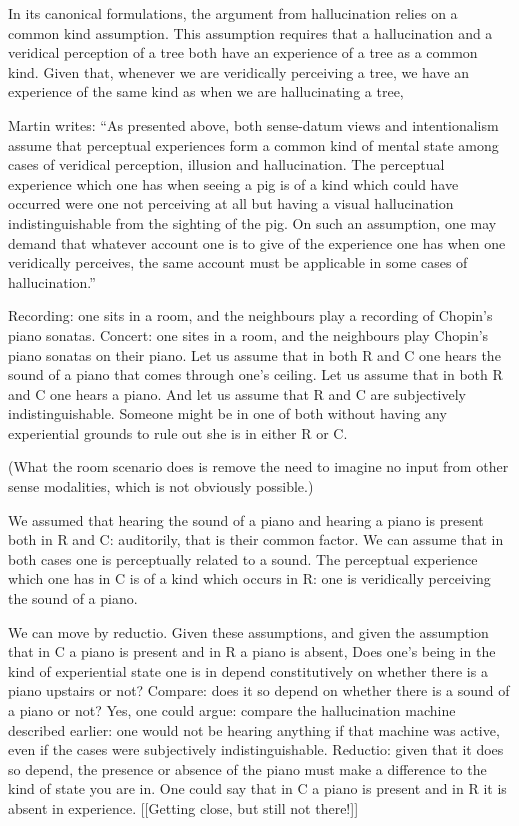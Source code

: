 \documentclass[sloppy, journal, git, bytitle, dodraft]{humapap}
\begin{document}
In its canonical formulations, the argument from hallucination relies on a common kind assumption. This assumption requires that a hallucination and a veridical perception of a tree both have an experience of a tree as a common kind. Given that, whenever we are veridically perceiving a tree, we have an experience of the same kind as when we are hallucinating a tree,

Martin writes: ``As presented above, both sense-datum views and intentionalism assume that perceptual experiences form a common kind of mental state among cases of veridical perception, illusion and hallucination. The perceptual experience which one has when seeing a pig is of a kind which could have occurred were one not perceiving at all but having a visual hallucination indistinguishable from the sighting of the pig. On such an assumption, one may demand that whatever account one is to give of the experience one has when one veridically perceives, the same account must be applicable in some cases of hallucination.''


Recording: one sits in a room, and the neighbours play a recording of Chopin's piano sonatas. Concert: one sites in a room, and the neighbours play Chopin's piano sonatas on their piano. Let us assume that in both R and C one hears the sound of a piano that comes through one's ceiling. Let us assume that in both R and C one hears a piano. And let us assume that R and C are subjectively indistinguishable. Someone might be in one of both without having any experiential grounds to rule out she is in either R or C. 

(What the room scenario does is remove the need to imagine no input from other sense modalities, which is not obviously possible.)

We assumed that hearing the sound of a piano and hearing a piano is present both in R and C: auditorily, that is their common factor. We can assume that in both cases one is perceptually related to a sound. The perceptual experience which one has in C is of a kind which occurs in R: one is veridically perceiving the sound of a piano. 

We can move by reductio. Given these assumptions, and given the assumption that in C a piano is present and in R a piano is absent, Does one's being in the kind of experiential state one is in depend constitutively on whether there is a piano upstairs or not? 
Compare: does it so depend on whether there is a sound of a piano or not? Yes, one could argue: compare the hallucination machine described earlier: one would not be hearing anything if that machine was active, even if the cases were subjectively indistinguishable. 
Reductio: given that it does so depend, the presence or absence of the piano must make a difference to the kind of state you are in. One could say that in C a piano is present and in R it is absent in experience. [[Getting close, but still not there!]]
\end{document}
